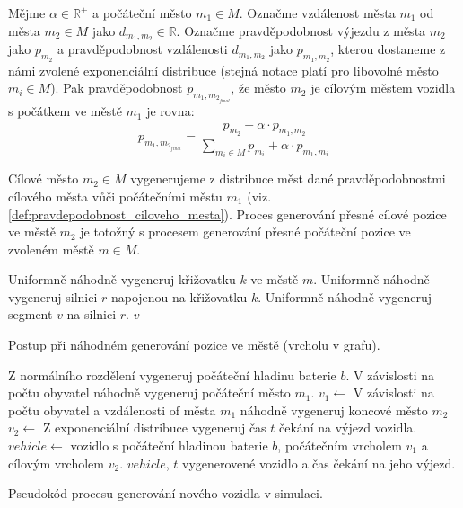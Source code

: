\begin{defn}\label{def:pravdepodobnost_ciloveho_mesta}
    Mějme $\alpha \in \mathbb{R}^+$ a počáteční město $m_1 \in M$. Označme vzdálenost 
    města $m_1$ od města $m_2 \in M$ jako $d_{m_1,m_2} \in \mathbb{R}$. 
    Označme pravděpodobnost
    výjezdu z města $m_2$ jako $p_{m_2}$ a pravděpodobnost vzdálenosti $d_{m_1,m_2}$ jako
    $p_{m_1,m_2}$, kterou dostaneme z námi zvolené exponenciální distribuce 
    (stejná notace platí pro libovolné město $m_i \in M$).
    Pak pravděpodobnost $p_{m_1,m_{2_{final}}}$, že město $m_2$ je cílovým městem
    vozidla s počátkem ve městě $m_1$ je rovna:
        $$p_{m_1,m_{2_{final}}} = 
            \frac{p_{m_2} + \alpha \cdot p_{m_1,m_2}}
            {\sum_{m_i \in M} p_{m_i} + \alpha \cdot p_{m_1,m_i}}$$
\end{defn}

Cílové město $m_2 \in M$ vygenerujeme z distribuce měst dané pravděpodobnostmi
cílového města vůči počátečními městu $m_1$ (viz. \cref{def:pravdepodobnost_ciloveho_mesta}).
Proces generování přesné cílové pozice ve městě $m_2$ je totožný s procesem 
generování přesné počáteční pozice ve zvoleném městě $m \in M$.

\begin{algorithm}
\begin{algorithmic}
    \State Uniformně náhodně vygeneruj křižovatku $k$ ve městě $m$.
    \State Uniformně náhodně vygeneruj silnici $r$ napojenou na křižovatku $k$.
    \State Uniformně náhodně vygeneruj segment $v$ na silnici $r$.
    \State \Return $v$
\EndFunction
\end{algorithmic}
\caption{Postup při náhodném generování pozice ve městě (vrcholu v grafu).}
\label{alg:generovani_pozice_ve_meste}
\end{algorithm}


\begin{algorithm}
\begin{algorithmic}
    \State Z normálního rozdělení vygeneruj počáteční hladinu baterie $b$.
    \State V závislosti na počtu obyvatel náhodně vygeneruj počáteční město $m_1$.
    \State $v_1 \gets$ 
    \State V závislosti na počtu obyvatel a vzdálenosti of města $m_1$ náhodně vygeneruj
    koncové město $m_2$
    \State $v_2 \gets$  
    \State Z exponenciální distribuce vygeneruj čas $t$ čekání na výjezd vozidla.
    \State $vehicle \gets$ vozidlo s počáteční hladinou baterie $b$, 
    počátečním vrcholem $v_1$ a cílovým vrcholem $v_2$.
    \State \Return $vehicle$, $t$ \Comment vygenerovené vozidlo a čas čekání na jeho výjezd.

\EndFunction
\end{algorithmic}
\caption{Pseudokód procesu generování nového vozidla v simulaci.}
\label{alg:generovani_vozidla}
\end{algorithm}


